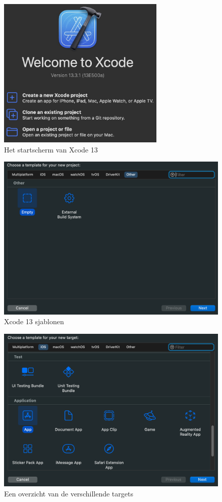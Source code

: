 \begin{figure}[h]
    \centering
    \includegraphics[width=80mm, scale=0.7]{img/xcodeversie.jpeg}
    \caption{Het startscherm van Xcode 13}
\end{figure}

\begin{figure}[h]
    \centering
    \includegraphics[width=\linewidth]{img/otherproject.png}
    \caption{Xcode 13 sjablonen}
\end{figure}

\begin{figure}[h]
    \centering
    \includegraphics[width=\linewidth]{img/iostarget.png}
    \caption{Een overzicht van de verschillende targets}
\end{figure}

